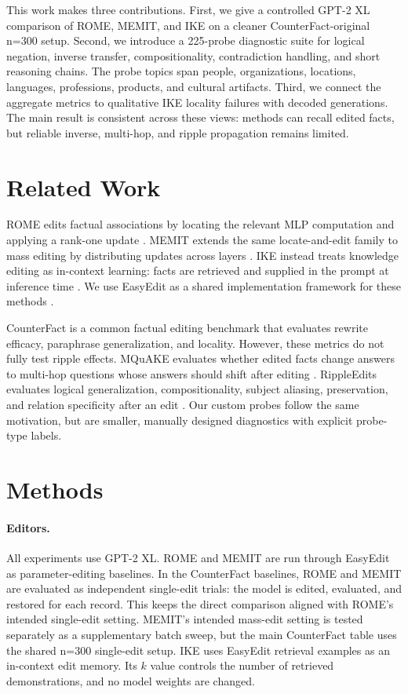\documentclass[11pt]{article}
\begin{document}
This work makes three contributions. First, we give a controlled GPT-2 XL comparison of ROME, MEMIT, and IKE on a cleaner CounterFact-original n=300 setup. Second, we introduce a 225-probe diagnostic suite for logical negation, inverse transfer, compositionality, contradiction handling, and short reasoning chains. The probe topics span people, organizations, locations, languages, professions, products, and cultural artifacts. Third, we connect the aggregate metrics to qualitative IKE locality failures with decoded generations. The main result is consistent across these views: methods can recall edited facts, but reliable inverse, multi-hop, and ripple propagation remains limited.

\section{Related Work}

ROME edits factual associations by locating the relevant MLP computation and applying a rank-one update \citep{meng2022rome}. MEMIT extends the same locate-and-edit family to mass editing by distributing updates across layers \citep{meng2023memit}. IKE instead treats knowledge editing as in-context learning: facts are retrieved and supplied in the prompt at inference time \citep{zheng2023ike}. We use EasyEdit as a shared implementation framework for these methods \citep{wang2024easyedit}.

CounterFact is a common factual editing benchmark that evaluates rewrite efficacy, paraphrase generalization, and locality. However, these metrics do not fully test ripple effects. MQuAKE evaluates whether edited facts change answers to multi-hop questions whose answers should shift after editing \citep{zhong2023mquake}. RippleEdits evaluates logical generalization, compositionality, subject aliasing, preservation, and relation specificity after an edit \citep{cohen2024ripple}. Our custom probes follow the same motivation, but are smaller, manually designed diagnostics with explicit probe-type labels.

\section{Methods}

\paragraph{Editors.}
All experiments use GPT-2 XL. ROME and MEMIT are run through EasyEdit as parameter-editing baselines. In the CounterFact baselines, ROME and MEMIT are evaluated as independent single-edit trials: the model is edited, evaluated, and restored for each record. This keeps the direct comparison aligned with ROME's intended single-edit setting. MEMIT's intended mass-edit setting is tested separately as a supplementary batch sweep, but the main CounterFact table uses the shared n=300 single-edit setup. IKE uses EasyEdit retrieval examples as an in-context edit memory. Its $k$ value controls the number of retrieved demonstrations, and no model weights are changed.
\end{document}
